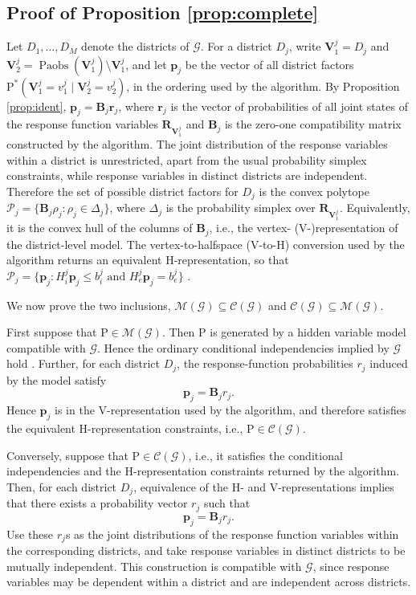 \documentclass[12pt]{article}
\def\Pr{{\mathrm{P}}}
\def\Pdo{{\mathrm{P}^*}}
\DeclareMathOperator{\Paobs}{Paobs}
\newcommand{\bV}{\boldsymbol{V}}
\newcommand{\bR}{\boldsymbol{R}}
\begin{document}
\subsection*{Proof of Proposition \ref{prop:complete}}

Let \(D_1,\ldots,D_M\) denote the districts of \(\mathcal{G}\).  For a district \(D_j\), write $\bV^j_1 = D_j$ and $\bV^j_2 = \Paobs(\bV^j_1)\setminus \bV^j_1$, and let $\boldsymbol{p}_j$ be the vector of all district factors $\Pdo(\bV^j_1=v^j_1\mid \bV^j_2=v^j_2)$, in the ordering used by the algorithm. By Proposition \ref{prop:ident}, $\boldsymbol{p}_j = \boldsymbol{B}_j \boldsymbol{r}_j$, where $\boldsymbol{r}_j$ is the vector of probabilities of all joint states of the response function variables $\bR_{\bV^j_1}$ and $\boldsymbol{B}_j$ is the zero-one compatibility matrix constructed by the algorithm. The joint distribution of the response variables within a district is unrestricted, apart from the usual probability simplex constraints, while response variables in distinct districts are independent. Therefore the set of possible district factors for $D_j$ is the convex polytope $\mathcal{P}_j = \{\boldsymbol{B}_j\rho_j : \rho_j\in\Delta_j\}$, where $\Delta_j$ is the probability simplex over $\bR_{\bV^j_1}$. Equivalently, it is the convex hull of the columns of $\boldsymbol{B}_j$, i.e., the vertex- (V-)representation of the district-level model. The vertex-to-halfspace (V-to-H) conversion used by the algorithm returns an equivalent H-representation, so that $\mathcal{P}_j = \{\boldsymbol{p}_j : H^j_{i}\boldsymbol{p}_j \le b^j_{i} \mbox{ and } H^j_{e}\boldsymbol{p}_j = b^j_{e}\}$ \citep{doubledescriptionmethod}.

We now prove the two inclusions, $\mathcal{M}(\mathcal{G}) \subseteq \mathcal{C}(\mathcal{G})$ and $\mathcal{C}(\mathcal{G}) \subseteq \mathcal{M}(\mathcal{G})$.

First suppose that $\Pr\in\mathcal{M}(\mathcal{G})$. Then $\Pr$ is generated by a hidden variable model compatible with $\mathcal{G}$.  Hence the ordinary conditional independencies implied by $\mathcal{G}$ hold \citep{evans2016graphs}.  Further, for each district $D_j$, the response-function probabilities $r_j$ induced by the model satisfy
\[
    \boldsymbol{p}_j=\boldsymbol{B}_j r_j.
\]
Hence $\boldsymbol{p}_j$ is in the V-representation used by the algorithm, and therefore satisfies the equivalent H-representation constraints, i.e., $\Pr\in \mathcal{C}(\mathcal{G})$.

Conversely, suppose that $\Pr\in \mathcal{C}(\mathcal{G})$, i.e., it satisfies the conditional independencies and the H-representation constraints returned by the algorithm.  Then, for each district $D_j$, equivalence of the H- and V-representations implies that
there exists a probability vector $r_j$ such that
\[
    \boldsymbol{p}_j=\boldsymbol{B}_j r_j.
\]
Use these $r_j$s as the joint distributions of the response function variables within the corresponding districts, and take response variables in distinct districts to be mutually independent.  This construction is compatible with \(\mathcal{G}\), since response variables may be dependent within a district and are independent across districts.
\end{document}
